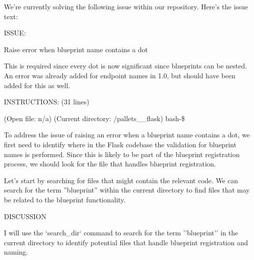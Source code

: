 {
\captionsetup{type=figure}
\begin{issuebox}We're currently solving the following issue within our repository. Here's the issue text:

ISSUE:

Raise error when blueprint name contains a dot

This is required since every dot is now significant since blueprints can be nested. An error was already added for endpoint names in 1.0, but should have been added for this as well.









INSTRUCTIONS: (31 lines)

\begin{CodeVerbatim}[breaklines=true, breakanywhere=true]
(Open file: n/a)
(Current directory: /pallets__flask)
bash-\$
\end{CodeVerbatim}
\end{issuebox}
\begin{agentbox}
To address the issue of raising an error when a blueprint name contains a dot, we first need to identify where in the Flask codebase the validation for blueprint names is performed. Since this is likely to be part of the blueprint registration process, we should look for the file that handles blueprint registration.



Let's start by searching for files that might contain the relevant code. We can search for the term ''blueprint'' within the current directory to find files that may be related to the blueprint functionality.



DISCUSSION

I will use the `search\_dir` command to search for the term ''blueprint'' in the current directory to identify potential files that handle blueprint registration and naming.




\end{agentbox}}

